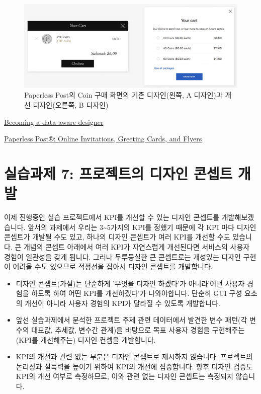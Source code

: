 \documentclass[
  letterpaper,
]{book}
\providecommand{\tightlist}{%
  \setlength{\itemsep}{0pt}\setlength{\parskip}{0pt}}\usepackage{longtable,booktabs,array}
\begin{document}
\begin{figure}[H]

{\centering \includegraphics{img/fig24.png}

}

\caption{Paperless Post의 Coin 구매 화면의 기존 디자인(왼쪽, A 디자인)과
개선 디자인(오른쪽, B 디자인)}

\end{figure}%

\href{https://uxdesign.cc/becoming-a-data-aware-designer-1d7614ebc3ed}{Becoming
a data-aware designer}

\href{https://www.paperlesspost.com}{Paperless Post®: Online
Invitations, Greeting Cards, and Flyers}

\section{실습과제 7: 프로젝트의 디자인 콘셉트
개발}\label{uxc2e4uxc2b5uxacfcuxc81c-7-uxd504uxb85cuxc81duxd2b8uxc758-uxb514uxc790uxc778-uxcf58uxc149uxd2b8-uxac1cuxbc1c}

이제 진행중인 실습 프로젝트에서 KPI를 개선할 수 있는 디자인 콘셉트를
개발해보겠습니다. 앞서의 과제에서 우리는 3\textasciitilde5가지의 KPI를
정했기 때문에 각 KPI 마다 디자인 콘셉트가 개발될 수도 있고, 하나의
디자인 콘셉트가 여러 KPI를 개선할 수도 있습니다. 큰 개념의 콘셉트
아래에서 여러 KPI가 자연스럽게 개선된다면 서비스의 사용자 경험이
일관성을 갖게 됩니다. 그러나 두루뭉실한 큰 콘셉트로는 개성있는 디자인
구현이 어려울 수도 있으므로 적정선을 잡아서 디자인 콘셉트를 개발합니다.

\begin{itemize}
\tightlist
\item
  디자인 콘셉트(가설)는 단순하게 '무엇을 디자인 하겠다'가 아니라'어떤
  사용자 경험을 하도록 하여 어떤 KPI를 개선하겠다'가 나와야합니다.
  단순히 GUI 구성 요소의 개선이 아니라 사용자 경험의 KPI가 달라질 수
  있도록 개발합니다.
\item
  앞선 실습과제에서 분석한 프로젝트 주제 관련 데이터에서 발견한 변수
  패턴(각 변수의 대표값, 추세값, 변수간 관계)을 바탕으로 목표 사용자
  경험을 구현해주는(KPI를 개선해주는) 디자인 컨셉을 개발합니다.
\item
  KPI의 개선과 관련 없는 부분은 디자인 콘셉트로 제시하지 않습니다.
  프로젝트의 논리성과 설득력을 높이기 위하여 KPI의 개선에 집중합니다.
  향후 디자인 검증도 KPI의 개선 여부로 측정하므로, 이와 관련 없는 디자인
  콘셉트는 측정되지 않습니다.
\end{itemize}
\end{document}
